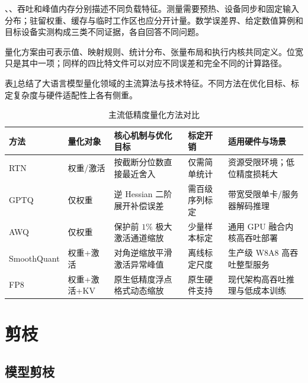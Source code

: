 \documentclass[../textbook.tex]{subfiles}
\begin{document}
、、吞吐和峰值内存分别描述不同负载特征。测量需要预热、设备同步和固定输入分布；驻留权重、缓存与临时工作区也应分开计量。数学误差界、给定数值算例和目标设备实测构成三类不同证据，各自回答不同问题。

\begin{note}[低精度计算的完整契约]
量化方案由可表示值、映射规则、统计分布、张量布局和执行内核共同定义。位宽只是其中一项；同样的四比特文件可以对应不同误差和完全不同的计算路径。
\end{note}

表\ref{tab:quantization-taxonomy}总结了大语言模型量化领域的主流算法与技术特征。不同方法在优化目标、标定复杂度与硬件适配性上各有侧重。

\begin{table}[htbp]
\centering
\small
\setlength{\tabcolsep}{3.5pt}
\caption{主流低精度量化方法对比}\label{tab:quantization-taxonomy}
\begin{tabularx}{\linewidth}{@{}lp{20mm}p{32mm}p{22mm}X@{}}
\toprule
方法 & 量化对象 & 核心机制与优化目标 & 标定开销 & 适用硬件与场景 \\
\midrule
RTN & 权重/激活 & 按截断分位数直接最近舍入 & 仅需简单统计 & 资源受限环境；低位精度损耗大 \\
GPTQ & 仅权重 & 逆 Hessian 二阶展开补偿误差 & 需百级序列标定 & 带宽受限单卡/服务器解码推理 \\
AWQ & 仅权重 & 保护前 $1\%$ 极大激活通道缩放 & 少量样本标定 & 通用 GPU 融合内核高吞吐部署 \\
SmoothQuant & 权重+激活 & 对角逆缩放平滑激活异常峰值 & 离线标定尺度 & 生产级 W8A8 高吞吐整型服务 \\
FP8 & 权重+激活+KV & 原生低精度浮点格式动态缩放 & 原生硬件支持 & 现代架构高吞吐推理与低成本训练 \\
\bottomrule
\end{tabularx}
\end{table}





\section{剪枝}
\subsection{模型剪枝}
\end{document}
